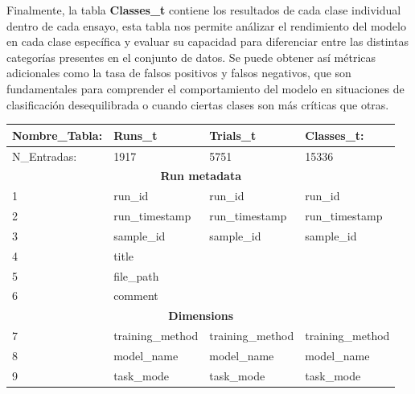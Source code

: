 Finalmente, la tabla \textbf{Classes\_t} contiene los resultados de cada clase individual dentro de cada ensayo, esta tabla nos permite análizar el rendimiento del modelo en cada clase específica y evaluar su capacidad para diferenciar entre las distintas categorías presentes en el conjunto de datos. Se puede obtener así métricas adicionales como la tasa de falsos positivos y falsos negativos, que son fundamentales para comprender el comportamiento del modelo en situaciones de clasificación desequilibrada o cuando ciertas clases son más críticas que otras.

\begin{table}[H]
  \centering
  \begin{tabular}{|l|l|l|l|}
    \hline
    Nombre\_Tabla: & \textbf{Runs\_t}         & \textbf{Trials\_t }      & \textbf{Classes\_t}: \\ \hline
    N\_Entradas:   & 1917                     & 5751                     & 15336                \\ \hline
    \multicolumn{4}{|c|}{\textbf{Run metadata}}                                                 \\ \hline
    1              & run\_id                  & run\_id                  & run\_id              \\ \hline
    2              & run\_timestamp           & run\_timestamp           & run\_timestamp       \\ \hline
    3              & sample\_id               & sample\_id               & sample\_id           \\ \hline
    4              & title                    & ~                        & ~                    \\ \hline
    5              & file\_path               & ~                        & ~                    \\ \hline
    6              & comment                  & ~                        & ~                    \\ \hline
    \multicolumn{4}{|c|}{\textbf{Dimensions}}                                                   \\ \hline
    7              & training\_method         & training\_method         & training\_method     \\ \hline
    8              & model\_name              & model\_name              & model\_name          \\ \hline
    9              & task\_mode               & task\_mode               & task\_mode           \\ \hline

\end{tabular}
\end{table}
